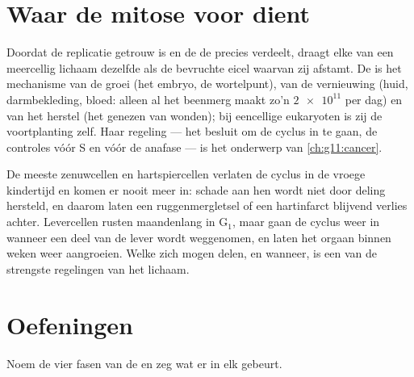 \section{Waar de mitose voor dient}

\begin{proposition}\label{prop:g11:cell-cycle-mitosis:conformity}
Doordat de replicatie getrouw is en de  de  precies
verdeelt, draagt elke  van een meercellig lichaam dezelfde  als de bevruchte eicel waarvan zij afstamt. De  is het
mechanisme van de groei (het embryo, de wortelpunt), van de vernieuwing
(huid, darmbekleding, bloed: alleen al het beenmerg maakt zo'n
$\num{2e11}$  per dag) en van het herstel (het genezen van wonden);
bij eencellige eukaryoten is zij de voortplanting zelf. Haar regeling ---
het besluit om de cyclus in te gaan, de controles vóór S en vóór de
anafase --- is het onderwerp van \cref{ch:g11:cancer}.
\end{proposition}
\admitted

\begin{remark}\label{rem:g11:cell-cycle-mitosis:notall}
De meeste zenuwcellen en hartspiercellen verlaten de cyclus in de vroege
kindertijd en komen er nooit meer in: schade aan hen wordt niet door
deling hersteld, en daarom laten een ruggenmergletsel of een hartinfarct
blijvend verlies achter. Levercellen rusten maandenlang in
$\mathrm{G_1}$, maar gaan de cyclus weer in wanneer een deel van de lever
wordt weggenomen, en laten het orgaan binnen weken weer aangroeien. Welke
 zich mogen delen, en wanneer, is een van de strengste regelingen
van het lichaam.
\end{remark}

\section{Oefeningen}

\begin{exercise}[$\star$]\label{exo:g11:cell-cycle-mitosis:1}
Noem de vier fasen van de  en zeg wat er in elk gebeurt.
\end{exercise}

